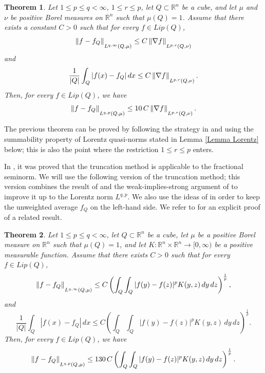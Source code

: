 \documentclass[reqno, 10pt, oneside]{amsart}
\numberwithin{equation}{section}
\newcommand{\strt}[1]{\rule{0pt}{#1}}
\newtheorem{theorem}{Theorem}
\numberwithin{theorem}{section}
\newcommand{\R}{{\mathbb R}}
\newcommand{\1}{{\rm 1\hspace*{-0.4ex}%
\rule{0.1ex}{1.52ex}\hspace*{0.2ex}}}
\begin{document}
\begin{theorem}\label{thm:truncation-method}
    Let $1\le p\le q<\infty$, $1\le r\le p$, let $Q\subset\R^n$ be a cube, and let $\mu$ and $\nu$ be positive Borel measures on $\R^n$ such that $\mu(Q)=1$. Assume that there exists a constant $C>0$ such that for every $f\in Lip(Q)$,
	\begin{equation*}
		\left\| f-f_Q\right\|_{\strt{2.3ex} L^{q,\infty}(Q,\mu)}\le C\left\|\nabla f \right\|_{\strt{2.3ex} L^{p,r}(Q,\nu) }
	\end{equation*}
	and
	\begin{equation*}
		\frac{1}{|Q|}\int_Q |f(x)-f_Q|\,dx\le C\left\|\nabla f \right\|_{\strt{2.3ex} L^{p,r}(Q,\nu) }.
	\end{equation*}
	Then, for every $f\in Lip(Q)$, we have
	\begin{equation*}
		\left\| f-f_Q\right\|_{\strt{2.3ex} L^{q,p}(Q,\mu)}\le 10\, C\left\|\nabla f \right\|_{\strt{2.3ex} L^{p,r}(Q,\nu) }.
	\end{equation*}
\end{theorem}


The previous theorem can be proved by following the strategy in  \cite[Theorem 3.1]{FPW98} and using the summability property of Lorentz quasi-norms stated in Lemma \ref{Lemma Lorentz} below; this is also the point where the restriction $1\le r\le p$ enters. 


In \cite{DLV21}, it was proved that the truncation method is applicable to the fractional seminorm. We will use the following version of the truncation method; this version combines the result of \cite{DLV21} and the weak-implies-strong argument of \cite{KO03} to improve it up to the Lorentz norm $L^{q,p}$. We also use the ideas of \cite[Theorem~3.1]{FPW98} in order to keep the unweighted average $f_Q$ on the left-hand side. We refer to \cite[Proposition A.2]{LoristWagenaar} for an explicit proof of a related result.

\begin{theorem}\label{Truncation method}
    Let $1\le p\le q<\infty$, let $Q\subset\R^n$ be a cube, let $\mu$ be a positive Borel measure on $\R^n$ such that $\mu(Q)=1$, and let $K:\R^n\times\R^n\to[0,\infty)$ be a positive measurable function. Assume that there exists $C>0$ such that for every $f\in Lip(Q)$,
	\begin{equation*}
		\left\| f-f_Q\right\|_{\strt{2.3ex} L^{q,\infty}(Q,\mu)} \le C\left(\int_Q\int_Q |f(y)-f(z)|^p K(y,z)\,dy\,dz\right)^\frac{1}{p},
	\end{equation*}
	and
	\begin{equation*}
		\frac{1}{|Q|}\int_Q |f(x)-f_Q|\,dx \le C\left(\int_Q\int_Q |f(y)-f(z)|^p K(y,z)\,dy\,dz\right)^\frac{1}{p}.
	\end{equation*}
	Then, for every $f\in Lip(Q)$, we have
	\begin{equation*}
		\left\| f-f_Q\right\|_{\strt{2.3ex} L^{q,p}(Q,\mu)} \le 130 \, C\left(\int_Q\int_Q |f(y)-f(z)|^p K(y,z)\,dy\,dz\right)^\frac{1}{p}.
	\end{equation*}
\end{theorem}
\end{document}
